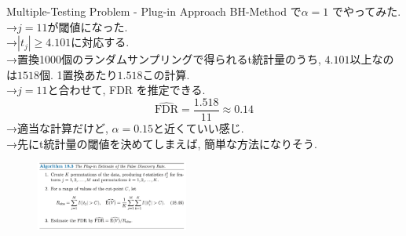 \documentclass[dvipdfmx,8pt]{beamer}
\begin{document}
  \begin{frame}{Multiple-Testing Problem - Plug-in Approach}
    BH-Method で$\alpha=1$ でやってみた. \\
    →$j=11$が閾値になった. \\
    →$|t_j|\ge 4.101$に対応する. \\
    →置換1000個のランダムサンプリングで得られるt統計量のうち, $4.101$以上なのは$1518$個.
    1置換あたり$1.518$この計算. \\
    →$j=11$と合わせて, FDR を推定できる.
    \[
      \hat{\mathrm{FDR}}=\frac{1.518}{11}\approx 0.14
    \]
    →適当な計算だけど, $\alpha=0.15$と近くていい感じ. \\
    →先にt統計量の閾値を決めてしまえば, 簡単な方法になりそう.
    \begin{figure}
      \centering
      \includegraphics[width=5cm]{./images/plug-in-fdr.png}
    \end{figure}
  \end{frame}
\end{document}
